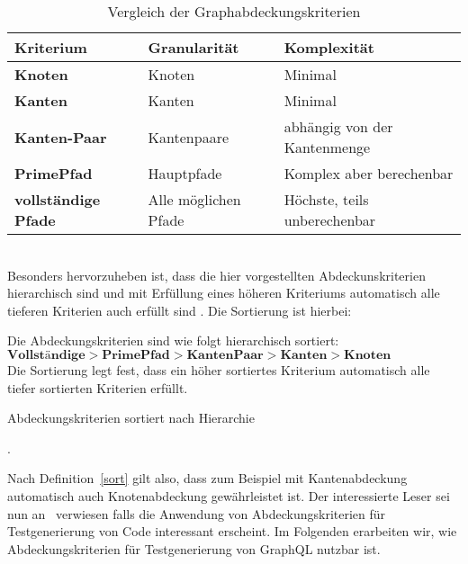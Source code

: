 \begin{center}
    \begin{table}[!ht]
        \begin{tabularx}{\textwidth}{|C|C|C|}
            \hline
            \textbf{Kriterium} & \textbf{Granularität} & \textbf{Komplexität} \\
            \hline
            \textbf{Knoten} & Knoten & Minimal \\
            \hline
            \textbf{Kanten} & Kanten & Minimal \\
            \hline
            \textbf{Kanten-Paar} & Kantenpaare & abhängig von der Kantenmenge \\
            \hline
            \textbf{PrimePfad} & Hauptpfade & Komplex aber berechenbar \\
            \hline
            \textbf{vollständige Pfade} & Alle möglichen Pfade & Höchste, teils unberechenbar \\
            \hline
        \end{tabularx}
        \caption{Vergleich der Graphabdeckungskriterien}
    \end{table}
\end{center}
\\

Besonders hervorzuheben ist, dass die hier vorgestellten Abdeckunskriterien hierarchisch sind und mit Erfüllung eines höheren Kriteriums automatisch alle tieferen Kriterien auch erfüllt sind \cite[vgl. Figure 2.15]{software-testing}.
Die Sortierung ist hierbei: \\
\begin{definition}
    Die Abdeckungskriterien sind wie folgt hierarchisch sortiert: \\
    $ \textbf{Vollständige} > \textbf{PrimePfad} > \textbf{KantenPaar} > \textbf{Kanten} > \textbf{Knoten} $ \\
    Die Sortierung legt fest, dass ein höher sortiertes Kriterium automatisch alle tiefer sortierten Kriterien erfüllt.
    \caption{Abdeckungskriterien sortiert nach Hierarchie~\cite[vgl. Figure 2.15]{software-testing}}.
    \label{sort}
\end{definition}

Nach Definition~\ref{sort} gilt also, dass zum Beispiel mit Kantenabdeckung automatisch auch Knotenabdeckung gewährleistet ist.
Der interessierte Leser sei nun an~\cite{software-testing} verwiesen falls die Anwendung von Abdeckungskriterien für Testgenerierung von Code interessant erscheint.
Im Folgenden erarbeiten wir, wie Abdeckungskriterien für Testgenerierung von GraphQL nutzbar ist.